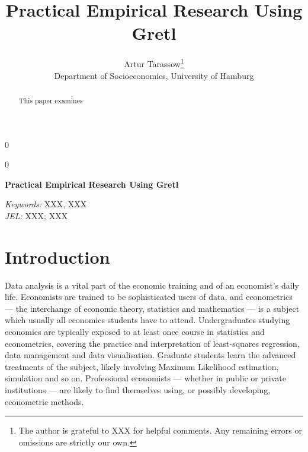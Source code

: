 \documentclass[11pt]{article}
\newcommand{\blind}{0}
\begin{document}
%

\def\spacingset#1{\renewcommand{\baselinestretch}%
	{#1}\small\normalsize} \spacingset{1}



\blind
{
	\title{\bf Practical Empirical Research Using Gretl}
	\author{Artur Tarassow\thanks{
			The author is grateful to XXX for helpful comments. Any remaining errors or omissions are strictly our own.}\hspace{.2cm}\\
		Department of Socioeconomics, University of Hamburg}
	\maketitle
} \fi

\blind
{
	\bigskip
	\bigskip
	\bigskip
	\begin{center}
		{\LARGE\bf Practical Empirical Research Using Gretl}
	\end{center}
	\medskip
} \fi

\bigskip
\begin{abstract}
	This paper examines 
\end{abstract}

\noindent%
{\it Keywords:} XXX, XXX\\
{\it JEL:} XXX; XXX

\vfill

\newpage
\doublespacing

\newpage
\section{Introduction}
\label{sec:intro}
Data analysis is a vital part of the economic training and of an economist's daily life. Economists are trained to be sophisticated users of data, and econometrics --- the interchange of economic theory, statistics and mathematics --- is a subject which usually all economics students have to attend. %
Undergraduates studying economics are typically exposed to at least once course in statistics and econometrics, covering the practice and interpretation of least-squares regression, data management and data visualisation. Graduate students learn the advanced treatments of the subject, likely involving Maximum Likelihood estimation, simulation and so on. Professional economists --- whether in public or private institutions --- are likely to find themselves using, or possibly developing, econometric methods.
\end{document}
